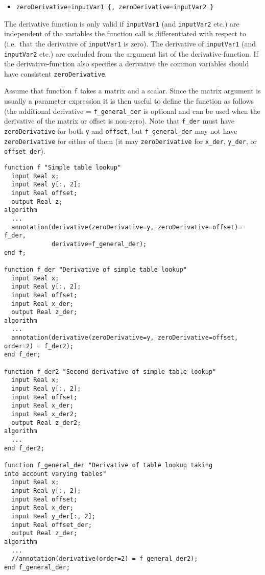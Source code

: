 \begin{itemize}
\item
  \lstinline!zeroDerivative=inputVar1 {, zeroDerivative=inputVar2 }!
\end{itemize}

The derivative function is only valid if \lstinline!inputVar1! (and \lstinline!inputVar2! etc.)
are independent of the variables the function call is differentiated
with respect to (i.e.\ that the derivative of \lstinline!inputVar1! is zero). The
derivative of \lstinline!inputVar1! (and \lstinline!inputVar2! etc.) are excluded from the
argument list of the derivative-function. If the derivative-function
also specifies a derivative the common variables should have consistent
\lstinline!zeroDerivative!.

\begin{nonnormative}
Assume that function \lstinline!f! takes a matrix and a scalar.
Since the matrix argument is usually a parameter expression it is then
useful to define the function as follows (the additional derivative =
\lstinline!f_general_der! is optional and can be used when the derivative of
the matrix or offset is non-zero). Note that \lstinline!f_der! must have
\lstinline!zeroDerivative! for both \lstinline!y! and \lstinline!offset!, but \lstinline!f_general_der! may not have
\lstinline!zeroDerivative! for either of them (it may \lstinline!zeroDerivative! for \lstinline!x_der!,
\lstinline!y_der!, or \lstinline!offset_der!).

\begin{lstlisting}[language=modelica]
function f "Simple table lookup"
  input Real x;
  input Real y[:, 2];
  input Real offset;
  output Real z;
algorithm
  ...
  annotation(derivative(zeroDerivative=y, zeroDerivative=offset)= f_der,
             derivative=f_general_der);
end f;

function f_der "Derivative of simple table lookup"
  input Real x;
  input Real y[:, 2];
  input Real offset;
  input Real x_der;
  output Real z_der;
algorithm
  ...
  annotation(derivative(zeroDerivative=y, zeroDerivative=offset, order=2) = f_der2);
end f_der;

function f_der2 "Second derivative of simple table lookup"
  input Real x;
  input Real y[:, 2];
  input Real offset;
  input Real x_der;
  input Real x_der2;
  output Real z_der2;
algorithm
  ...
end f_der2;

function f_general_der "Derivative of table lookup taking
into account varying tables"
  input Real x;
  input Real y[:, 2];
  input Real offset;
  input Real x_der;
  input Real y_der[:, 2];
  input Real offset_der;
  output Real z_der;
algorithm
  ...
  //annotation(derivative(order=2) = f_general_der2);
end f_general_der;
\end{lstlisting}
\end{nonnormative}

